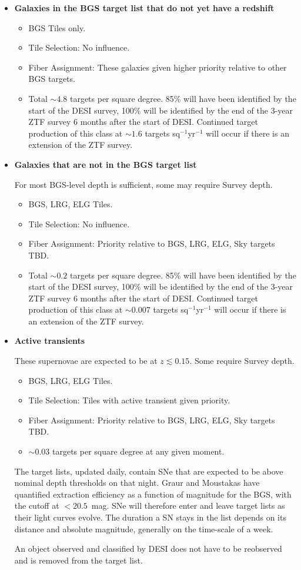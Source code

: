 \documentclass[11pt]{article}   	%
\begin{document}
\begin{itemize}
\item {\bf Galaxies in the BGS target list that do not yet have a redshift}

\begin{itemize}
\item BGS Tiles only.
\item Tile Selection: No influence.
\item Fiber Assignment: These galaxies given higher priority relative to other BGS targets.
\item Total $\sim 4.8$ targets per square degree.  85\% will have been identified by the start of the DESI survey, 100\% will be
identified by the end of the 3-year ZTF survey 6 months after the start of DESI.   Continued target production of this class at $\sim 1.6$ targets sq$^{-1}$yr$^{-1}$ will occur if there is an extension
of the ZTF survey.
\end{itemize}
\item {\bf Galaxies that are not in the BGS target list}

For most BGS-level depth is sufficient, some may require Survey depth.
\begin{itemize}
\item BGS, LRG, ELG Tiles.
\item Tile Selection: No influence. 
\item Fiber Assignment: Priority relative to BGS, LRG, ELG, Sky targets TBD.
\item Total $\sim 0.2$ targets per square degree.  85\% will have been identified by the start of the DESI survey, 100\% will be
identified by the end of the 3-year ZTF survey 6 months after the start of DESI.
Continued target production of this class  at $\sim 0.007$ targets sq$^{-1}$yr$^{-1}$ will occur if there is an extension
of the ZTF survey.
\end{itemize}
\item {\bf Active transients}

These supernovae are expected to be at $z \lesssim 0.15$.  Some require Survey depth.
\begin{itemize}
\item BGS, LRG, ELG Tiles.
\item Tile Selection: Tiles with active transient given priority.
\item Fiber Assignment: Priority relative to BGS, LRG, ELG, Sky targets TBD.
\item $\sim 0.03$ targets per square degree at any given moment.
\end{itemize}
The target lists, updated daily, contain SNe that are expected to be above nominal depth thresholds on that night.
 Graur and Moustakas have quantified extraction efficiency as a function
of magnitude for the BGS, with the cutoff at   $<20.5$~mag.
SNe will therefore enter and leave target lists as their light curves evolve. 
The duration a SN stays in the list depends on its distance
and absolute magnitude, generally on the time-scale of a week.

An object observed and classified by DESI does not have to be reobserved and is removed from the target list.
\end{itemize}
\end{document}
